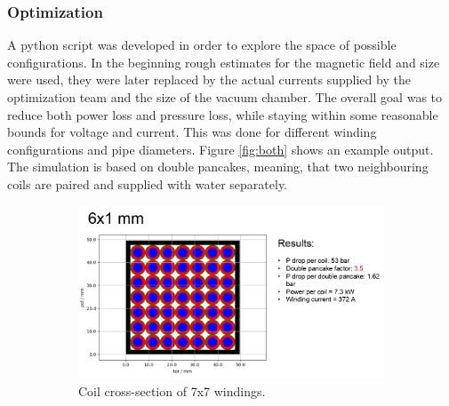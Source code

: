 \subsubsection{Optimization}
A python script was developed in order to explore the space of possible configurations.
In the beginning rough estimates for the magnetic field and size were used, they were later replaced by the actual currents supplied by the optimization team and the size of the vacuum chamber.
The overall goal was to reduce both power loss and pressure loss, while staying within some reasonable bounds for voltage and current.
This was done for different winding configurations and pipe diameters.
Figure \ref{fig:both} shows an example output. The simulation is based on double pancakes, meaning, that two neighbouring coils are paired and supplied with water separately.
\begin{figure}[h]
    \centering
    \begin{subfigure}[b]{0.7\textwidth}
        \centering
        \includegraphics[width=\textwidth]{Images/02_Coils/crosssection.png}
        \caption{Coil cross-section of 7x7 windings.}
        \label{fig:crosssection}
    \end{subfigure}\hfill
    \begin{subfigure}[b]{0.3\textwidth}
        \centering

\end{subfigure}
\end{figure}
